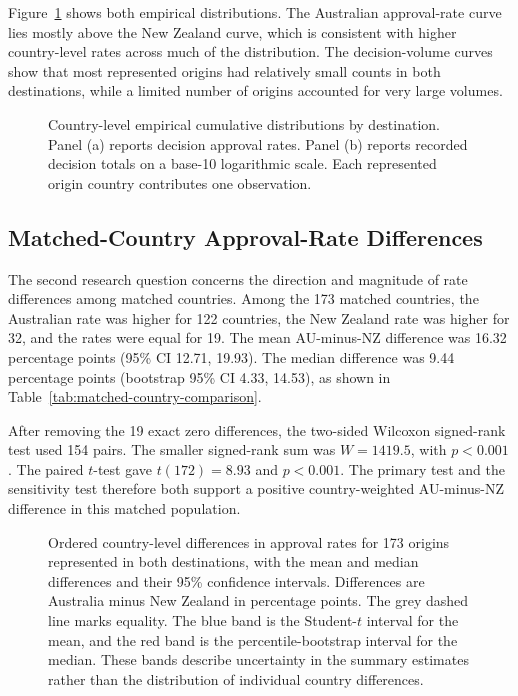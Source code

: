 \documentclass[runningheads]{llncs}
\begin{document}
Figure~\ref{fig:descriptive-ecdfs} shows both empirical distributions. The Australian approval-rate curve lies mostly above the New Zealand curve, which is consistent with higher country-level rates across much of the distribution. The decision-volume curves show that most represented origins had relatively small counts in both destinations, while a limited number of origins accounted for very large volumes.

\begin{figure}
\centering

\caption{Country-level empirical cumulative distributions by destination. Panel (a) reports decision approval rates. Panel (b) reports recorded decision totals on a base-10 logarithmic scale. Each represented origin country contributes one observation.}
\label{fig:descriptive-ecdfs}
\end{figure}

\subsection{Matched-Country Approval-Rate Differences}

The second research question concerns the direction and magnitude of rate differences among matched countries. Among the 173 matched countries, the Australian rate was higher for 122 countries, the New Zealand rate was higher for 32, and the rates were equal for 19. The mean AU-minus-NZ difference was 16.32 percentage points (95\% CI 12.71, 19.93). The median difference was 9.44 percentage points (bootstrap 95\% CI 4.33, 14.53), as shown in Table~\ref{tab:matched-country-comparison}.



After removing the 19 exact zero differences, the two-sided Wilcoxon signed-rank test used 154 pairs. The smaller signed-rank sum was $W=1419.5$, with $p<0.001$. The paired $t$-test gave $t(172)=8.93$ and $p<0.001$. The primary test and the sensitivity test therefore both support a positive country-weighted AU-minus-NZ difference in this matched population.

\begin{figure}
\centering

\caption{Ordered country-level differences in approval rates for 173 origins represented in both destinations, with the mean and median differences and their 95\% confidence intervals. Differences are Australia minus New Zealand in percentage points. The grey dashed line marks equality. The blue band is the Student-$t$ interval for the mean, and the red band is the percentile-bootstrap interval for the median. These bands describe uncertainty in the summary estimates rather than the distribution of individual country differences.}
\label{fig:matched-difference-distribution}
\end{figure}
\end{document}
